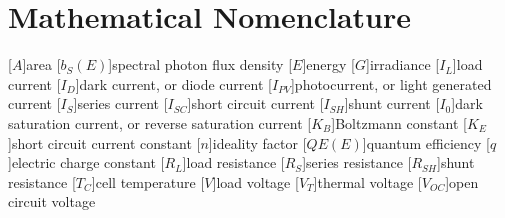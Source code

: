 \chapter{Mathematical Nomenclature}

\begin{acronym}
    [$A$]{area}
    [$b_S(E)$]{spectral photon flux density}
    [$E$]{energy}
    [$G$]{irradiance}
    [$I_L$]{load current}
    [$I_D$]{dark current, or diode current}
    [$I_{PV}$]{photocurrent, or light generated current}
    [$I_S$]{series current}
    [$I_{SC}$]{short circuit current}
    [$I_{SH}$]{shunt current}
    [$I_0$]{dark saturation current, or reverse saturation current}
    [$K_B$]{Boltzmann constant}
    [$K_E$]{short circuit current constant}
    [$n$]{ideality factor}
    [$QE(E)$]{quantum efficiency}
    [$q$]{electric charge constant}
    [$R_L$]{load resistance}
    [$R_S$]{series resistance}
    [$R_{SH}$]{shunt resistance}
    [$T_C$]{cell temperature}
    [$V$]{load voltage}
    [$V_T$]{thermal voltage}
    [$V_{OC}$]{open circuit voltage}
\end{acronym}